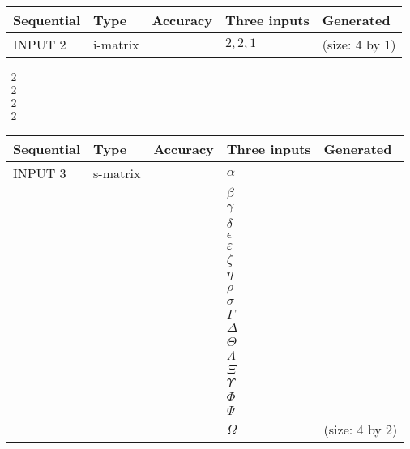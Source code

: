 \documentclass[12pt]{article}
\begin{document}
  
\noindent\begin{tabular}{|l|l|l|l|l|}
\hline
 Sequential & Type & Accuracy & Three inputs & Generated \\ 
\hline
 
 
  INPUT $           2$ & i-matrix &  & $
 2
 , 
 2
 , 
 1
 $ & (size:           4 by           1)
 \\  \hline  
 \end{tabular}
   
   
 $\begin{array}{
 c
 }
           2 \\ 
           2 \\ 
           2 \\ 
           2
\end{array}  $ 
  
  
\noindent\begin{tabular}{|l|l|l|l|l|}
\hline
 Sequential & Type & Accuracy & Three inputs & Generated \\ 
\hline
 
 
  INPUT $           3$ & s-matrix & & 
 $  \alpha $ & 
  \\
  & & & 
 $  \beta $ & 
  \\
  & & & 
 $  \gamma $ & 
  \\
  & & & 
 $  \delta $ & 
  \\
  & & & 
 $  \epsilon $ & 
  \\
  & & & 
 $  \varepsilon $ & 
  \\
  & & & 
 $                     \zeta $ & 
  \\
  & & & 
 $  \eta $ & 
  \\
  & & & 
 $  \rho $ & 
  \\
  & & & 
 $  \sigma $ & 
  \\
  & & & 
 $  \Gamma $ & 
  \\
  & & & 
 $  \Delta $ & 
  \\
  & & & 
 $  \Theta $ & 
  \\
  & & & 
 $  \Lambda $ & 
  \\
  & & & 
 $                     \Xi $ & 
  \\
  & & & 
 $  \Upsilon $ & 
  \\
  & & & 
 $  \Phi $ & 
  \\
  & & & 
 $  \Psi $ & 
  \\
  & & & 
 $  \Omega $ & 
  (size:           4 by           2)
 \\  \hline  
 \end{tabular}
   
\end{document}
